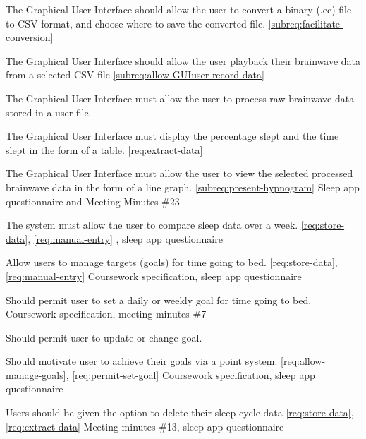 {The Graphical User Interface should allow the user to convert a binary (.ec) file to CSV format,
  and choose where to save the converted file.}
{\phigh}
{\ref{subreq:facilitate-conversion}}
{}

{The Graphical User Interface should allow the user playback their brainwave data from a selected CSV file}
{\phigh}
{\ref{subreq:allow-GUIuser-record-data}}
{}

{The Graphical User Interface must allow the user to process raw brainwave data stored in a user file.}
{\phigh}
{\dnone}
{}

{The Graphical User Interface must display the percentage slept and the time slept in the form of a table.}
{\phigh}
{\ref{req:extract-data}}
{}

{The Graphical User Interface must allow the user to view the selected processed brainwave data in
  the form of a line graph.}
{\phigh}
{\ref{subreq:present-hypnogram}}
{Sleep app questionnaire and Meeting Minutes \#23}


{The system must allow the user to compare sleep data over a week.}
{\phigh}
{\ref{req:store-data}, \ref{req:manual-entry}}
{\textcite{British-Medical-Association:2018aa}, sleep app questionnaire}


{Allow users to manage targets (goals) for time going to bed.}
{\pmed}
{\ref{req:store-data}, \ref{req:manual-entry}}
{Coursework specification, sleep app questionnaire}

{Should permit user to set a daily or weekly goal for time going to bed.}
{\pmed}
{\dnone}
{Coursework specification, meeting minutes \#7}

{Should permit user to update or change goal.}
{\pmed}
{\dnone}
{\sspec}

{Should motivate user to achieve their goals via a point system.}
{\pmed}
{\ref{req:allow-manage-goals}, \ref{req:permit-set-goal}}
{Coursework specification, sleep app questionnaire}


{Users should be given the option to delete their sleep cycle data}
{\plow}
{\ref{req:store-data}, \ref{req:extract-data}}
{Meeting minutes \#13, sleep app questionnaire}
